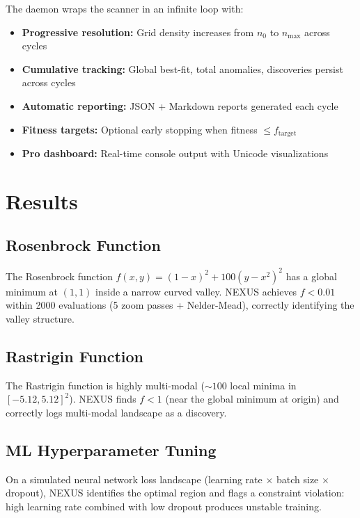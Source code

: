\documentclass[twocolumn,prd,nofootinbib]{revtex4-2}
\begin{document}
The daemon wraps the scanner in an infinite loop with:
\begin{itemize}
    \item \textbf{Progressive resolution:} Grid density increases from $n_0$ to $n_\mathrm{max}$ across cycles
    \item \textbf{Cumulative tracking:} Global best-fit, total anomalies, discoveries persist across cycles
    \item \textbf{Automatic reporting:} JSON + Markdown reports generated each cycle
    \item \textbf{Fitness targets:} Optional early stopping when fitness $\leq f_\mathrm{target}$
    \item \textbf{Pro dashboard:} Real-time console output with Unicode visualizations
\end{itemize}

\section{Results}

\subsection{Rosenbrock Function}

The Rosenbrock function $f(x,y) = (1-x)^2 + 100(y-x^2)^2$ has a global minimum at $(1,1)$ inside a narrow curved valley. \textsc{NEXUS} achieves $f < 0.01$ within 2000 evaluations (5 zoom passes + Nelder-Mead), correctly identifying the valley structure.

\subsection{Rastrigin Function}

The Rastrigin function is highly multi-modal ($\sim 100$ local minima in $[-5.12, 5.12]^2$). \textsc{NEXUS} finds $f < 1$ (near the global minimum at origin) and correctly logs multi-modal landscape as a discovery.

\subsection{ML Hyperparameter Tuning}

On a simulated neural network loss landscape (learning rate $\times$ batch size $\times$ dropout), \textsc{NEXUS} identifies the optimal region and flags a constraint violation: high learning rate combined with low dropout produces unstable training.
\end{document}
